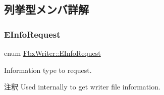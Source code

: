 \subsection{列挙型メンバ詳解}
\mbox{\label{class_fbx_writer_a250cda8a59afd8e6be01c89cdd914e2a}} 
\subsubsection{\texorpdfstring{E\+Info\+Request}{EInfoRequest}}
{\footnotesize\ttfamily enum \hyperlink{class_fbx_writer_a250cda8a59afd8e6be01c89cdd914e2a}{Fbx\+Writer\+::\+E\+Info\+Request}}

Information type to request. \begin{DoxyRemark}{注釈}
Used internally to get writer file information. 
\end{DoxyRemark}
